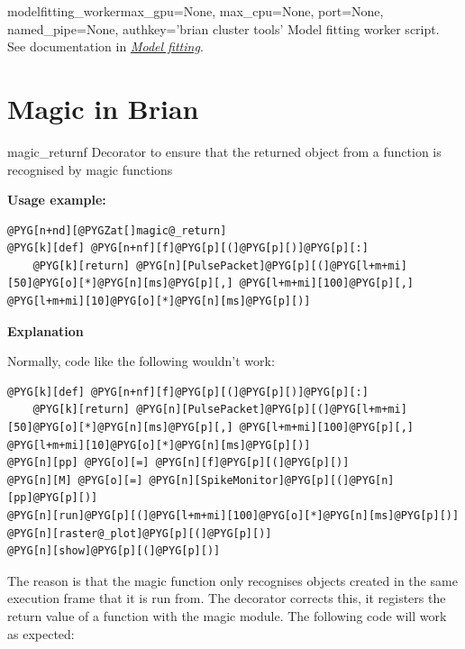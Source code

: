 \documentclass[letterpaper,10pt,english]{manual}
\begin{document}
\hypertarget{brian.library.modelfitting.modelfitting_worker}{}\begin{funcdesc}{modelfitting\_worker}{max\_gpu=None, max\_cpu=None, port=None, named\_pipe=None, authkey='brian cluster tools'}
Model fitting worker script. See documentation in \hyperlink{model-fitting-library}{\emph{Model fitting}}.
\end{funcdesc}

\resetcurrentobjects
\hypertarget{--doc-reference-magic}{}

\hypertarget{index-91}{}\section{Magic in Brian}

\hypertarget{brian.magic_return}{}\begin{funcdesc}{magic\_return}{f}
Decorator to ensure that the returned object from a function is recognised by magic functions

\textbf{Usage example:}

\begin{Verbatim}[commandchars=@\[\]]
@PYG[n+nd][@PYGZat[]magic@_return]
@PYG[k][def] @PYG[n+nf][f]@PYG[p][(]@PYG[p][)]@PYG[p][:]
    @PYG[k][return] @PYG[n][PulsePacket]@PYG[p][(]@PYG[l+m+mi][50]@PYG[o][*]@PYG[n][ms]@PYG[p][,] @PYG[l+m+mi][100]@PYG[p][,] @PYG[l+m+mi][10]@PYG[o][*]@PYG[n][ms]@PYG[p][)]
\end{Verbatim}

\textbf{Explanation}

Normally, code like the following wouldn't work:

\begin{Verbatim}[commandchars=@\[\]]
@PYG[k][def] @PYG[n+nf][f]@PYG[p][(]@PYG[p][)]@PYG[p][:]
    @PYG[k][return] @PYG[n][PulsePacket]@PYG[p][(]@PYG[l+m+mi][50]@PYG[o][*]@PYG[n][ms]@PYG[p][,] @PYG[l+m+mi][100]@PYG[p][,] @PYG[l+m+mi][10]@PYG[o][*]@PYG[n][ms]@PYG[p][)]
@PYG[n][pp] @PYG[o][=] @PYG[n][f]@PYG[p][(]@PYG[p][)]
@PYG[n][M] @PYG[o][=] @PYG[n][SpikeMonitor]@PYG[p][(]@PYG[n][pp]@PYG[p][)]
@PYG[n][run]@PYG[p][(]@PYG[l+m+mi][100]@PYG[o][*]@PYG[n][ms]@PYG[p][)]
@PYG[n][raster@_plot]@PYG[p][(]@PYG[p][)]
@PYG[n][show]@PYG[p][(]@PYG[p][)]
\end{Verbatim}

The reason is that the magic function \hyperlink{brian.run}{} only recognises objects created
in the same execution frame that it is run from. The \hyperlink{brian.magic_return}{} decorator
corrects this, it registers the return value of a function with the magic
module. The following code will work as expected:


\end{funcdesc}
\end{document}
